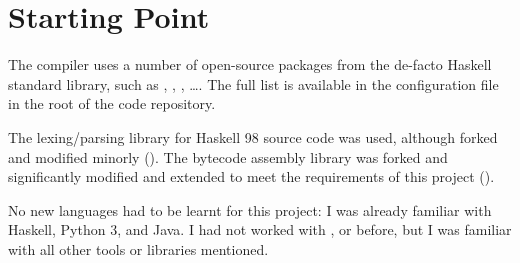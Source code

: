 \documentclass[dissertation.tex]{subfiles}
\begin{document}
\section{Starting Point}\label{sec:starting-point}
{

    The compiler uses a number of open-source packages from the de-facto Haskell standard library, such as
    , , , \dots. The full list is available in the
     configuration file in the root of the code repository.

    The  lexing/parsing library for Haskell 98 source code was used, although forked and modified
    minorly (). The bytecode assembly library  was forked and significantly
    modified and extended to meet the requirements of this project ().

    No new languages had to be learnt for this project: I was already familiar with Haskell, Python 3, and Java. I had
    not worked with ,  or  before, but I was familiar
    with all other tools or libraries mentioned.

}
\end{document}
